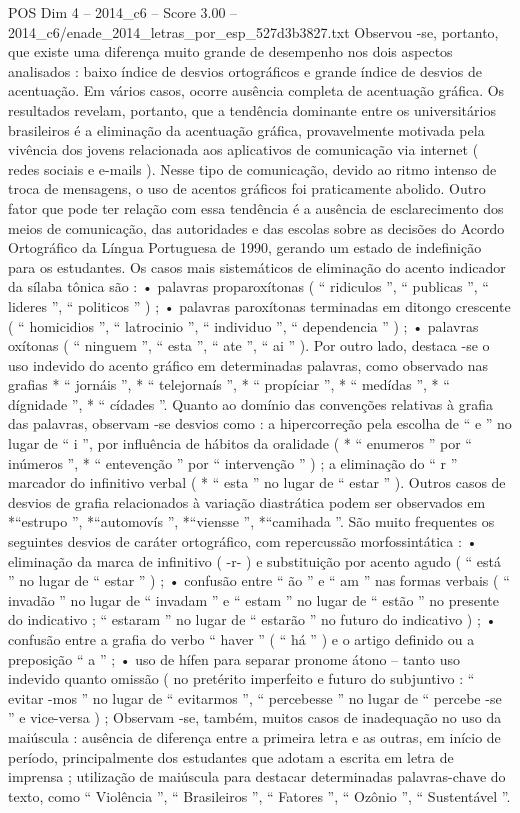 \begin{textsample}{POS Dim 4 – 2014\_c6 – Score 3.00 – 2014\_c6/enade\_2014\_letras\_por\_esp\_527d3b3827.txt}
Observou -se, portanto, que existe uma diferença muito grande de desempenho nos dois aspectos analisados : baixo índice de desvios ortográficos e grande índice de desvios de acentuação.
Em vários casos, ocorre ausência completa de acentuação gráfica.
Os resultados revelam, portanto, que a tendência dominante entre os universitários brasileiros é a eliminação da acentuação gráfica, provavelmente motivada pela vivência dos jovens relacionada aos aplicativos de comunicação via internet ( redes sociais e e-mails ).
Nesse tipo de comunicação, devido ao ritmo intenso de troca de mensagens, o uso de acentos gráficos foi praticamente abolido.
Outro fator que pode ter relação com essa tendência é a ausência de esclarecimento dos meios de comunicação, das autoridades e das escolas sobre as decisões do Acordo Ortográfico da Língua Portuguesa de 1990, gerando um estado de indefinição para os estudantes.
Os casos mais sistemáticos de eliminação do acento indicador da sílaba tônica são : • palavras proparoxítonas ( “ ridiculos ”, “ publicas ”, “ lideres ”, “ politicos ” ) ; • palavras paroxítonas terminadas em ditongo crescente ( “ homicidios ”, “ latrocinio ”, “ individuo ”, “ dependencia ” ) ; • palavras oxítonas ( “ ninguem ”, “ esta ”, “ ate ”, “ ai ” ).
Por outro lado, destaca -se o uso indevido do acento gráfico em determinadas palavras, como observado nas grafias * “ jornáis ”, * “ telejornaís ”, * “ propíciar ”, * “ medídas ”, * “ dígnidade ”, * “ cídades ”.
Quanto ao domínio das convenções relativas à grafia das palavras, observam -se desvios como : a hipercorreção pela escolha de “ e ” no lugar de “ i ”, por influência de hábitos da oralidade ( * “ enumeros ” por “ inúmeros ”, * “ entevenção ” por “ intervenção ” ) ; a eliminação do “ r ” marcador do infinitivo verbal ( * “ esta ” no lugar de “ estar ” ).
Outros casos de desvios de grafia relacionados à variação diastrática podem ser observados em *“estrupo ”, *“automovís ”, *“viensse ”, *“camihada ”.
São muito frequentes os seguintes desvios de caráter ortográfico, com repercussão morfossintática : • eliminação da marca de infinitivo ( -r- ) e substituição por acento agudo ( “ está ” no lugar de “ estar ” ) ; • confusão entre “ ão ” e “ am ” nas formas verbais ( “ invadão ” no lugar de “ invadam ” e “ estam ” no lugar de “ estão ” no presente do indicativo ; “ estaram ” no lugar de “ estarão ” no futuro do indicativo ) ; • confusão entre a grafia do verbo “ haver ” ( “ há ” ) e o artigo definido ou a preposição “ a ” ; • uso de hífen para separar pronome átono – tanto uso indevido quanto omissão ( no pretérito imperfeito e futuro do subjuntivo : “ evitar -mos ” no lugar de “ evitarmos ”, “ percebesse ” no lugar de “ percebe -se ” e vice-versa ) ; Observam -se, também, muitos casos de inadequação no uso da maiúscula : ausência de diferença entre a primeira letra e as outras, em início de período, principalmente dos estudantes que adotam a escrita em letra de imprensa ; utilização de maiúscula para destacar determinadas palavras-chave do texto, como “ Violência ”, “ Brasileiros ”, “ Fatores ”, “ Ozônio ”, “ Sustentável ”.

\end{textsample}

